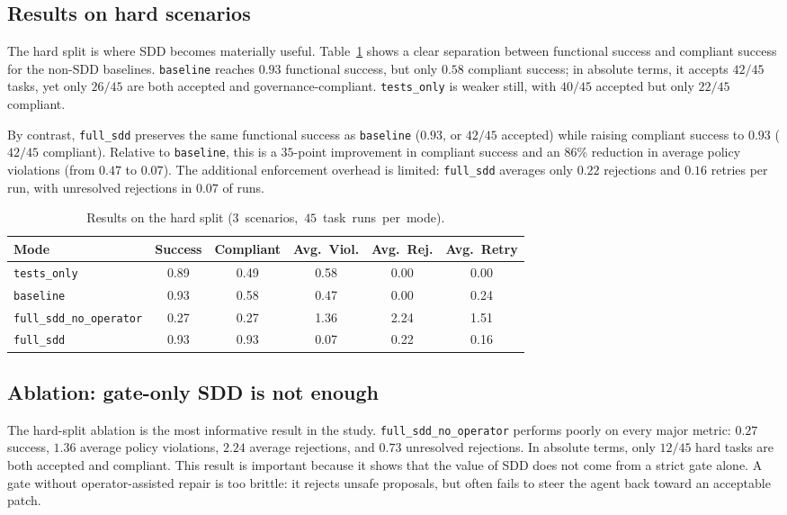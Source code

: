 \subsection{Results on hard scenarios}

The hard split is where SDD becomes materially useful. Table~\ref{tab:hard-results}
shows a clear separation between functional success and compliant success for the
non-SDD baselines. \texttt{baseline} reaches $0.93$ functional success, but only
$0.58$ compliant success; in absolute terms, it accepts $42/45$ tasks, yet only
$26/45$ are both accepted and governance-compliant. \texttt{tests\_only} is
weaker still, with $40/45$ accepted but only $22/45$ compliant.

By contrast, \texttt{full\_sdd} preserves the same functional success as
\texttt{baseline} ($0.93$, or $42/45$ accepted) while raising compliant success
to $0.93$ ($42/45$ compliant). Relative to \texttt{baseline}, this is a
$35$-point improvement in compliant success and an $86\%$ reduction in average
policy violations (from $0.47$ to $0.07$). The additional enforcement overhead
is limited: \texttt{full\_sdd} averages only $0.22$ rejections and
$0.16$ retries per run, with unresolved rejections in $0.07$ of runs.

\begin{table}[t]
\centering
\small
\begin{tabular}{lccccc}
\toprule
\textbf{Mode} & \textbf{Success} & \textbf{Compliant} & \textbf{Avg.\ Viol.} & \textbf{Avg.\ Rej.} & \textbf{Avg.\ Retry} \\
\midrule
\texttt{tests\_only} & 0.89 & 0.49 & 0.58 & 0.00 & 0.00 \\
\texttt{baseline} & 0.93 & 0.58 & 0.47 & 0.00 & 0.24 \\
\texttt{full\_sdd\_no\_operator} & 0.27 & 0.27 & 1.36 & 2.24 & 1.51 \\
\texttt{full\_sdd} & 0.93 & 0.93 & 0.07 & 0.22 & 0.16 \\
\bottomrule
\end{tabular}
\caption{Results on the hard split (\mbox{$3$ scenarios, $45$ task runs per mode}).}
\label{tab:hard-results}
\end{table}

\subsection{Ablation: gate-only SDD is not enough}

The hard-split ablation is the most informative result in the study.
\texttt{full\_sdd\_no\_operator} performs poorly on every major metric:
$0.27$ success, $1.36$ average policy violations, $2.24$ average rejections,
and $0.73$ unresolved rejections. In absolute terms, only $12/45$ hard tasks
are both accepted and compliant. This result is important because it shows that
the value of SDD does not come from a strict gate alone. A gate without
operator-assisted repair is too brittle: it rejects unsafe proposals, but often
fails to steer the agent back toward an acceptable patch.

